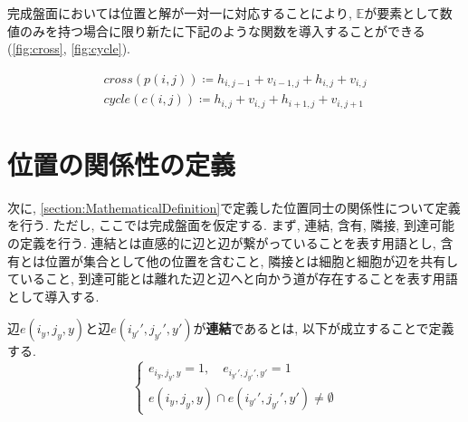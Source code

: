 完成盤面においては位置と解が一対一に対応することにより, $\mathbb{E}$が要素として数値のみを持つ場合に限り新たに下記のような関数を導入することができる(\cref{fig:cross}, \cref{fig:cycle}).

\begin{definition}\label{definition:Function}
  \begin{gather*}
    \textit{cross}(p(i,j))\coloneqq h_{i,j-1}+v_{i-1,j}+h_{i,j}+v_{i,j} \\
    \textit{cycle}(c(i,j))\coloneqq h_{i,j}+v_{i,j}+h_{i+1,j}+v_{i,j+1}
  \end{gather*}
\end{definition}




\section{位置の関係性の定義}\label{section:RelationDefinition}

次に, \cref{section:MathematicalDefinition}で定義した位置同士の関係性について定義を行う. ただし, ここでは完成盤面を仮定する.
まず, 連結, 含有, 隣接, 到達可能の定義を行う.
連結とは直感的に辺と辺が繋がっていることを表す用語とし, 含有とは位置が集合として他の位置を含むこと, 隣接とは細胞と細胞が辺を共有していること, 到達可能とは離れた辺と辺へと向かう道が存在することを表す用語として導入する.

\begin{definition}[連結]\label{definition:Connection}
  辺$e(i_y,j_y,y)$と辺$e(i_{y'}',j_{y'}',y')$が\textbf{連結}であるとは, 以下が成立することで定義する.
  \begin{equation*}
    \begin{cases}
      {e_{i_y,j_y,y}=1,\quad e_{i_{y'}',j_{y'}',y'}  =     1          } \\
      {e(i_y,j_y,y)\cap e(i_{y'}',j_{y'}',y')  \neq  \emptyset}
    \end{cases}
  \end{equation*}
\end{definition}

